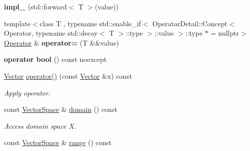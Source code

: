 \begin{DoxyCompactItemize}
\item 
\hypertarget{classSpacy_1_1Operator_a5366af2ad8250526eb713521fb50fe96}{{\bfseries impl\-\_\-} (std\-::forward$<$ \-T $>$(value))}\label{classSpacy_1_1Operator_a5366af2ad8250526eb713521fb50fe96}

\item 
\hypertarget{classSpacy_1_1Operator_a05ad03a9a9f680740872ebcd580823df}{{\footnotesize template$<$class T , typename std\-::enable\-\_\-if$<$ Operator\-Detail\-::\-Concept$<$ Operator, typename std\-::decay$<$ T $>$\-::type $>$\-::value $>$\-::type $\ast$  = nullptr$>$ }\\\hyperlink{classSpacy_1_1Operator}{\-Operator} \& {\bfseries operator=} (\-T \&\&value)}\label{classSpacy_1_1Operator_a05ad03a9a9f680740872ebcd580823df}

\item 
\hypertarget{classSpacy_1_1Operator_a001d31b07dd53fab2d0681cb8d6c9f6f}{{\bfseries operator bool} () const noexcept}\label{classSpacy_1_1Operator_a001d31b07dd53fab2d0681cb8d6c9f6f}

\item 
\hypertarget{classSpacy_1_1Operator_a2ab6072d6f9d98e0d5590531c080e3ad}{\hyperlink{classSpacy_1_1Vector}{\-Vector} \hyperlink{classSpacy_1_1Operator_a2ab6072d6f9d98e0d5590531c080e3ad}{operator()} (const \hyperlink{classSpacy_1_1Vector}{\-Vector} \&x) const }\label{classSpacy_1_1Operator_a2ab6072d6f9d98e0d5590531c080e3ad}

\begin{DoxyCompactList}\small\item\em \-Apply operator. \end{DoxyCompactList}\item 
\hypertarget{classSpacy_1_1Operator_a3b3d457bee48adf00d683a6aec4aa841}{const \hyperlink{classSpacy_1_1VectorSpace}{\-Vector\-Space} \& \hyperlink{classSpacy_1_1Operator_a3b3d457bee48adf00d683a6aec4aa841}{domain} () const }\label{classSpacy_1_1Operator_a3b3d457bee48adf00d683a6aec4aa841}

\begin{DoxyCompactList}\small\item\em \-Access domain space $X$. \end{DoxyCompactList}\item 
\hypertarget{classSpacy_1_1Operator_a8cf3b1e3b6c5c6ab5ddc09224ed8ab24}{const \hyperlink{classSpacy_1_1VectorSpace}{\-Vector\-Space} \& \hyperlink{classSpacy_1_1Operator_a8cf3b1e3b6c5c6ab5ddc09224ed8ab24}{range} () const }\label{classSpacy_1_1Operator_a8cf3b1e3b6c5c6ab5ddc09224ed8ab24}


\end{DoxyCompactItemize}
